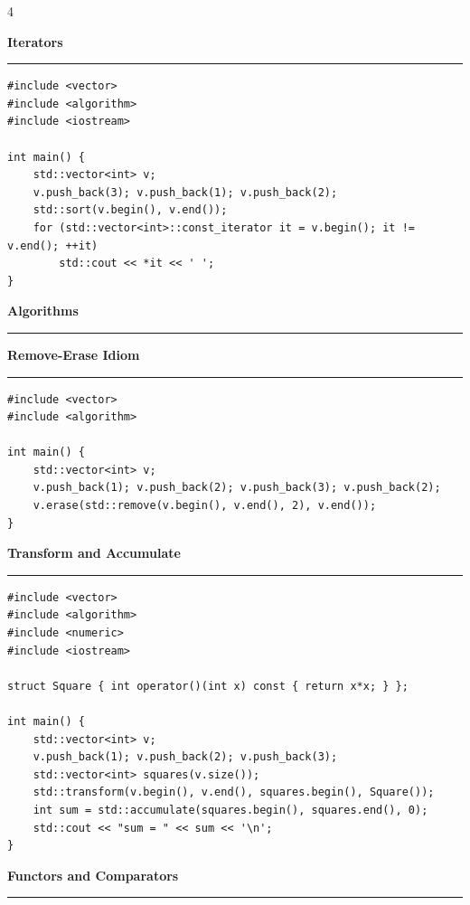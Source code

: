 \documentclass[final]{beamer}
\renewcommand{\section}[1]{%
  \par\vspace{1em}%
  {\noindent\Large\bfseries #1\par}%
  \vspace{0.5em}\hrule\vspace{1em}%
}
\renewcommand{\subsection}[1]{%
  \par\vspace{1em}%
  {\noindent\large\bfseries #1\par}%
  \vspace{0.5em}\hrule\vspace{1em}%

}
\begin{document}
\begin{frame}[t,fragile]
\begin{multicols}{4}
\section{Iterators}

\begin{lstlisting}
#include <vector>
#include <algorithm>
#include <iostream>

int main() {
    std::vector<int> v;
    v.push_back(3); v.push_back(1); v.push_back(2);
    std::sort(v.begin(), v.end());
    for (std::vector<int>::const_iterator it = v.begin(); it != v.end(); ++it)
        std::cout << *it << ' ';
}
\end{lstlisting}

\section{Algorithms}

\subsection{Remove-Erase Idiom}

\begin{lstlisting}
#include <vector>
#include <algorithm>

int main() {
    std::vector<int> v;
    v.push_back(1); v.push_back(2); v.push_back(3); v.push_back(2);
    v.erase(std::remove(v.begin(), v.end(), 2), v.end());
}
\end{lstlisting}

\subsection{Transform and Accumulate}

\begin{lstlisting}
#include <vector>
#include <algorithm>
#include <numeric>
#include <iostream>

struct Square { int operator()(int x) const { return x*x; } };

int main() {
    std::vector<int> v;
    v.push_back(1); v.push_back(2); v.push_back(3);
    std::vector<int> squares(v.size());
    std::transform(v.begin(), v.end(), squares.begin(), Square());
    int sum = std::accumulate(squares.begin(), squares.end(), 0);
    std::cout << "sum = " << sum << '\n';
}
\end{lstlisting}

\section{Functors and Comparators}


\end{multicols}
\end{frame}
\end{document}
